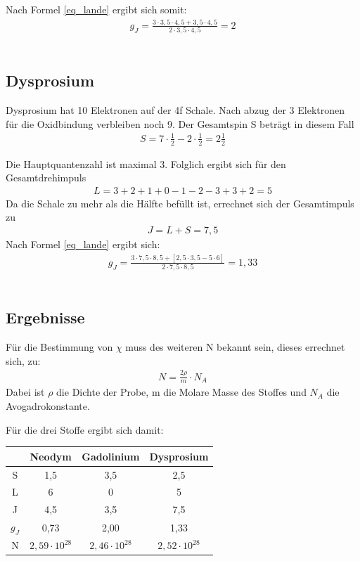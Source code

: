 Nach Formel \eqref{eq_lande} ergibt sich somit:
	\begin{align}
	g_J=\frac{3\cdot3,5\cdot4,5+3,5\cdot4,5}{2\cdot 3,5\cdot4,5}=2
	\end{align}\\

\subsection{Dysprosium }
Dysprosium hat 10 Elektronen auf der 4f Schale. Nach abzug der 3 Elektronen für die Oxidbindung verbleiben noch 9. Der Gesamtspin S beträgt in diesem Fall 
\begin{align*}
S= 7\cdot \frac{1}{2}-2\cdot\frac{1}{2}= 2 \frac{1}{2}
\end{align*}

Die Hauptquantenzahl ist maximal 3. Folglich ergibt sich für den Gesamtdrehimpuls
\begin{align*}
L= 3+2+1+0-1-2-3+3+2=5
\end{align*} 
Da die Schale zu mehr als die Hälfte befüllt ist, errechnet sich der Gesamtimpuls zu 
\begin{align*}
J=L+S=7,5
\end{align*}
Nach Formel \eqref{eq_lande} ergibt sich:
\begin{align}
g_J=\frac{3\cdot7,5\cdot8,5+[2,5\cdot3,5-5\cdot6]}{2\cdot 7,5\cdot8,5}=1,33
\end{align}\\

\subsection{Ergebnisse}
Für die Bestimmung von $\chi$ muss des weiteren N bekannt sein, dieses errechnet sich, zu:
\begin{align}
N=\frac{2\rho}{m}\cdot N_A
\end{align}
Dabei ist $\rho$ die Dichte der Probe, m die Molare Masse des Stoffes und $N_A$ die Avogadrokonstante.

Für die drei Stoffe ergibt sich damit:

\begin{table}[H]
\begin{tabular}{c|c|c|c|}
   & Neodym & Gadolinium & Dysprosium\\ \hline
  S& 1,5 & 3,5 & 2,5 \\ \hline
  L& 6   & 0   & 5   \\ \hline
  J& 4,5 & 3,5 & 7,5 \\ \hline
  $g_J$& 0,73 & 2,00 & 1,33 \\ \hline
N & $2,59\cdot10^{28}$ & $2,46 \cdot10^{28}$ & $2,52\cdot10^{28}$\\ \hline
\end{tabular}
\end{table}


